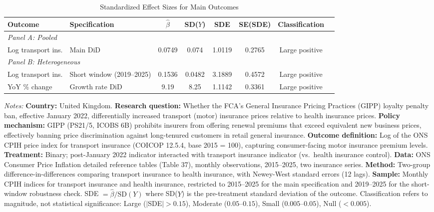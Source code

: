 \begin{table}[H]
\centering
\caption{Standardized Effect Sizes for Main Outcomes}
\label{tab:sde}
\begin{threeparttable}
\footnotesize
\begin{adjustbox}{max width=\textwidth}
\begin{tabular}{llcccccc}
\toprule
Outcome & Specification & $\hat{\beta}$ & SD($Y$) & SDE & SE(SDE) & Classification \\
\midrule
\multicolumn{7}{l}{\textit{Panel A: Pooled}} \\
Log transport ins. & Main DiD & 0.0749 & 0.074 & 1.0119 & 0.2765 & Large positive \\
\midrule
\multicolumn{7}{l}{\textit{Panel B: Heterogeneous}} \\
Log transport ins. & Short window (2019--2025) & 0.1536 & 0.0482 & 3.1889 & 0.4572 & Large positive \\
YoY \% change & Growth rate DiD & 9.19 & 8.25 & 1.1142 & 0.3361 & Large positive \\
\bottomrule
\end{tabular}
\end{adjustbox}
\begin{tablenotes}[flushleft]
\small
\item \textit{Notes:} \textbf{Country:} United Kingdom. \textbf{Research question:} Whether the FCA's General Insurance Pricing Practices (GIPP) loyalty penalty ban, effective January 2022, differentially increased transport (motor) insurance prices relative to health insurance prices. \textbf{Policy mechanism:} GIPP (PS21/5, ICOBS 6B) prohibits insurers from offering renewal premiums that exceed equivalent new business prices, effectively banning price discrimination against long-tenured customers in retail general insurance. \textbf{Outcome definition:} Log of the ONS CPIH price index for transport insurance (COICOP 12.5.4, base 2015 = 100), capturing consumer-facing motor insurance premium levels. \textbf{Treatment:} Binary; post-January 2022 indicator interacted with transport insurance indicator (vs.\ health insurance control). \textbf{Data:} ONS Consumer Price Inflation detailed reference tables (Table 37), monthly observations, 2015--2025, two insurance series. \textbf{Method:} Two-group difference-in-differences comparing transport insurance to health insurance, with Newey-West standard errors (12 lags). \textbf{Sample:} Monthly CPIH indices for transport insurance and health insurance, restricted to 2015--2025 for the main specification and 2019--2025 for the short-window robustness check. SDE $= \hat{\beta} / \text{SD}(Y)$ where SD($Y$) is the pre-treatment standard deviation of the outcome. Classification refers to magnitude, not statistical significance: Large ($|$SDE$| > 0.15$), Moderate ($0.05$--$0.15$), Small ($0.005$--$0.05$), Null ($< 0.005$).
\end{tablenotes}
\end{threeparttable}
\end{table}
